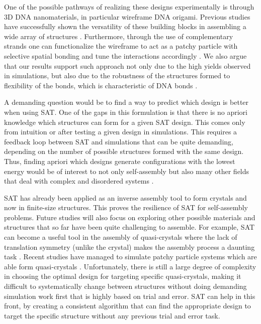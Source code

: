 \documentclass[a4paper, amsfonts, amssymb, amsmath, reprint, showkeys, nofootinbib, twoside]{revtex4-1}
\begin{document}
One of the possible pathways of realizing these designs experimentally is through 3D DNA nanomaterials, in particular wireframe DNA origami. Previous studies have successfully shown the versatility of these building blocks in assembling a wide array of structures \cite{Mosayebi2017, Lee2022, Jun2021, Rothemund2006}. Furthermore, through the use of complementary strands one can functionalize the wireframe to act as a patchy particle with selective spatial bonding and tune the interactions accordingly \cite{Biancaniello2005, Wang2015}. We also argue that our results support such approach not only due to the high yields observed in simulations, but also due to the robustness of the structures formed to flexibility of the bonds, which is characteristic of DNA bonds \cite{Meulen2015, Meulen2015, Geerts2010}.

A demanding question would be to find a way to predict which design is better when using SAT. One of the gaps in this formulation is that there is no apriori knowledge which structures can form for a given SAT design. This comes only from intuition or after testing a given design in simulations. This requires a feedback loop between SAT and simulations that can be quite demanding, depending on the number of possible structures formed with the same design. Thus, finding apriori which designs generate configurations with the lowest energy would be of interest to not only self-assembly but also many other fields that deal with complex and disordered systems \cite{Franz2017}.

SAT has already been applied as an inverse assembly tool to form crystals and now in finite-size structures. This proves the resilience of SAT for self-assembly problems. Future studies will also focus on exploring other possible materials and structures that so far have been quite challenging to assemble. For example, SAT can become a useful tool in the assembly of quasi-crystals where the lack of translation symmetry (unlike the crystal) makes the assembly process a daunting task \cite{Shechtman1984}. Recent studies have managed to simulate patchy particle systems which are able form quasi-crystals \cite{Noya2021}. Unfortunately, there is still a large degree of complexity in choosing the optimal design for targeting specific quasi-crystals, making it difficult to systematically change between structures without doing demanding simulation work first that is highly based on trial and error. SAT can help in this front, by creating a consistent algorithm that can find the appropriate design to target the specific structure without any previous trial and error task.
\end{document}
